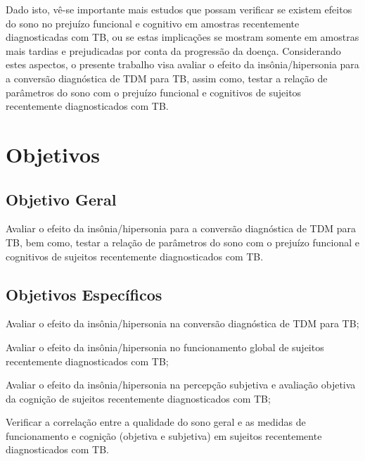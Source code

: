 \documentclass[chapter=TITLE,
               oneside,
               12pt,
               a4paper,
               english,
               brazil]{abntex2}    %
\begin{document}
    Dado isto, vê-se importante mais estudos que possam verificar se existem efeitos
    do sono no prejuízo funcional e cognitivo em amostras recentemente diagnosticadas
    com TB, ou se estas implicações se mostram somente em amostras mais
    tardias e prejudicadas por conta da progressão da doença.
    Considerando estes aspectos, o presente trabalho visa avaliar o efeito da
    insônia/hipersonia para a conversão diagnóstica de TDM para TB, assim como,
    testar a relação de parâmetros do sono com o prejuízo funcional e cognitivos
    de sujeitos recentemente diagnosticados com TB.

\vspace{\onelineskip}
\chapter{Objetivos}\label{sec:objetivos}

    \section{Objetivo Geral}\label{sec:geral}
    
            Avaliar o efeito da insônia/hipersonia para a conversão
            diagnóstica de TDM para TB, bem como, testar a relação de parâmetros
            do sono com o prejuízo funcional e cognitivos de sujeitos recentemente
            diagnosticados com TB.
    
    \section{Objetivos Específicos}\label{sec:especifico}
    
        \begin{alineas}
    
            \item Avaliar o efeito da insônia/hipersonia na conversão
            diagnóstica de TDM para TB;

            \item Avaliar o efeito da insônia/hipersonia no funcionamento global
            de sujeitos recentemente diagnosticados com TB;
    
            \item Avaliar o efeito da insônia/hipersonia na percepção subjetiva
            e avaliação objetiva da cognição de sujeitos recentemente diagnosticados
            com TB;

            \item Verificar a correlação entre a qualidade do sono geral e as
            medidas de funcionamento e cognição (objetiva e subjetiva) em
            sujeitos recentemente diagnosticados com TB.
    
        \end{alineas}
\end{document}
